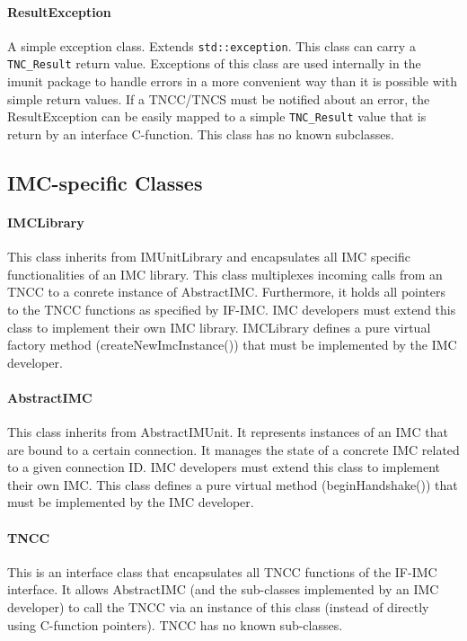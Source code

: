 \documentclass[a4paper,10pt]{scrartcl}
\begin{document}
\paragraph{ResultException}
A simple exception class. Extends \verb+std::exception+. This class can carry a \verb+TNC_Result+ return value. Exceptions of this class
are used internally in the imunit package to handle errors in a more convenient way than it is possible with simple return values. If a TNCC/TNCS
must be notified about an error, the ResultException can be easily mapped to a simple \verb+TNC_Result+ value that is return by an interface C-function.
This class has no known subclasses.

\subsection{IMC-specific Classes}
\paragraph{IMCLibrary}
This class inherits from IMUnitLibrary and encapsulates all IMC specific functionalities of an IMC library. This class multiplexes incoming calls
from an TNCC to a conrete instance of AbstractIMC. Furthermore, it holds all pointers to the TNCC functions as specified by IF-IMC. IMC developers
must extend this class to implement their own IMC library. IMCLibrary defines a pure virtual factory method (createNewImcInstance()) that must
be implemented by the IMC developer.

\paragraph{AbstractIMC}
This class inherits from AbstractIMUnit. It represents instances of an IMC that are bound to a certain connection. It manages the state
of a concrete IMC related to a given connection ID. IMC developers must extend this class to implement their own IMC.
This class defines a pure virtual method (beginHandshake()) that must be implemented by the IMC developer.

\paragraph{TNCC}
This is an interface class that encapsulates all TNCC functions of the IF-IMC interface. It allows AbstractIMC (and the sub-classes implemented
by an IMC developer) to call the TNCC via an instance of this class (instead of directly using C-function pointers). TNCC has no known sub-classes.
\end{document}
